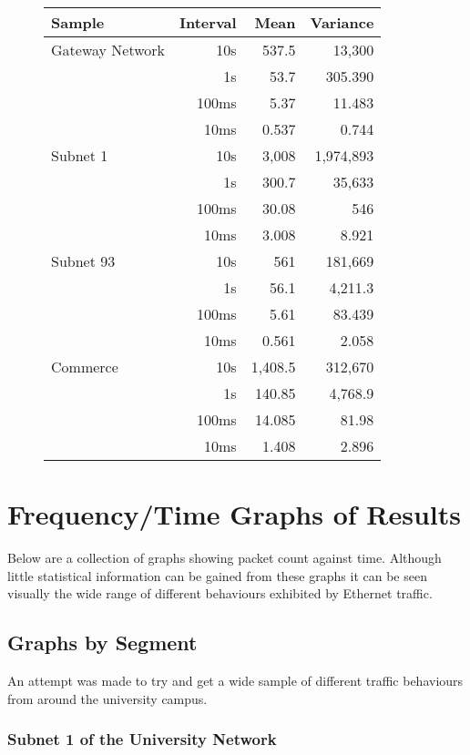 \begin{figure}
{\begin{tabular}{|p{4cm}|r|r|r|} \hline
Sample & Interval & Mean & Variance \\ \hline \hline
Gateway Network & 10s & 537.5 & 13,300 \\
		& 1s & 53.7 & 305.390 \\
		& 100ms & 5.37 & 11.483 \\
		& 10ms & 0.537 & 0.744 \\ \hline
Subnet 1 & 10s & 3,008 & 1,974,893 \\
	 & 1s & 300.7 & 35,633 \\
	 & 100ms & 30.08 & 546 \\
	 & 10ms & 3.008 & 8.921 \\ \hline
Subnet 93 & 10s & 561 & 181,669 \\
	  & 1s & 56.1 & 4,211.3 \\
	  & 100ms & 5.61 & 83.439 \\
	  & 10ms & 0.561 & 2.058 \\ \hline
Commerce  & 10s & 1,408.5 & 312,670 \\
	  & 1s  & 140.85  & 4,768.9 \\
	  & 100ms & 14.085 & 81.98 \\
	  & 10ms & 1.408 & 2.896 \\ \hline 
\end{tabular}}
\end{figure}

\section{Frequency/Time Graphs of Results}

Below are a collection of graphs showing packet count against time.
Although little statistical information can be gained from these
graphs it can be seen visually the wide range of different behaviours
exhibited by Ethernet traffic.

\subsection{Graphs by Segment}

An attempt was made to try and get a wide sample of different traffic
behaviours from around the university campus.

\subsubsection{Subnet 1 of the University Network}

